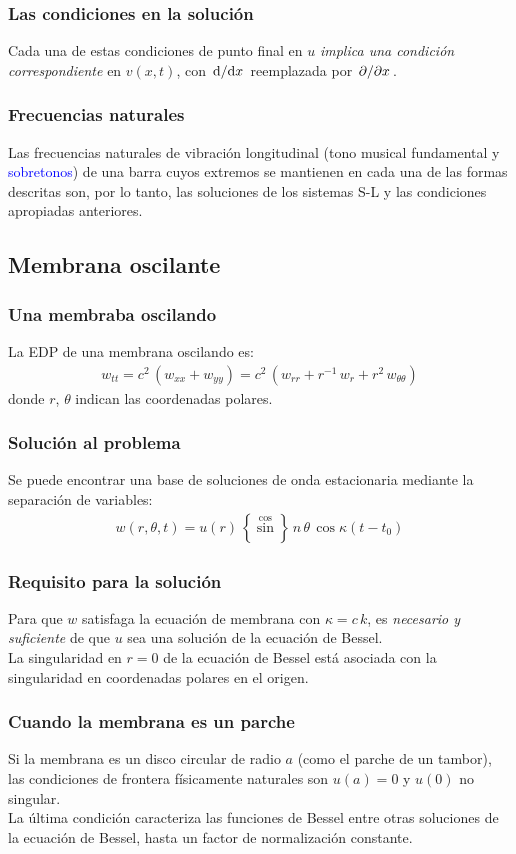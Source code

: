 \documentclass[12pt]{beamer}
\begin{document}
\begin{frame}
\frametitle{Las condiciones en la solución}
Cada una de estas condiciones de punto final en $u$ \emph{implica una condición correspondiente} en $v (x, t)$, con $\dv*{x}$ reemplazada por $\pdv*{x}$.
\end{frame}
\begin{frame}
\frametitle{Frecuencias naturales}
Las frecuencias naturales de vibración longitudinal (\textcolor{lava}{tono musical fundamental} y \textcolor{blue}{sobretonos}) de una barra cuyos extremos se mantienen en cada una de las formas descritas son, \pause por lo tanto, las soluciones de los sistemas S-L y las condiciones apropiadas anteriores.
\end{frame}

\subsection{Membrana oscilante}

\begin{frame}
\frametitle{Una membraba oscilando}
La EDP de una membrana oscilando es:
\begin{align*}
w_{tt} = c^{2} \, (w_{xx} + w_{yy}) = c^{2} \, (w_{rr} + r^{-1} \, w_{r} + r^{2} \, w_{\theta \theta})
\end{align*}
donde $r$, $\theta$ indican las coordenadas polares.
\end{frame}
\begin{frame}
\frametitle{Solución al problema}
Se puede encontrar una base de soluciones de onda estacionaria mediante la separación de variables:
\begin{align*}
w (r, \theta, t) = u (r) \, \left\{ \stackrel{\displaystyle \cos}{\sin} \right\} \, n \, \theta \, \cos \kappa (t - t_{0})
\end{align*}
\end{frame}
\begin{frame}
\frametitle{Requisito para la solución}
Para que $w$ satisfaga la ecuación de membrana con $\kappa = c \, k$, \pause es \emph{necesario y suficiente} de que $u$ sea una solución de la ecuación de Bessel.
\\
\bigskip
\pause
La singularidad en $r = 0$ de la ecuación de Bessel está asociada con la singularidad en coordenadas polares en el origen.
\end{frame}
\begin{frame}
\frametitle{Cuando la membrana es un parche}
Si la membrana es un disco circular de radio $a$ (como el parche de un tambor), \pause las condiciones de frontera físicamente naturales son $u (a) = 0$ y $u(0)$ no singular.
\\
\bigskip
\pause
La última condición caracteriza las funciones de Bessel entre otras soluciones de la ecuación de Bessel, hasta un factor de normalización constante.
\end{frame}
\end{document}
